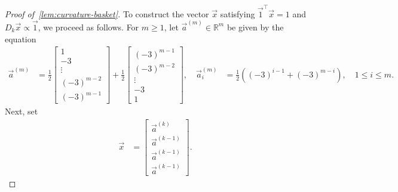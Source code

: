 \documentclass[11pt,a4paper]{article}
\newcommand{\distmatrix}{D}
\newcommand{\x}{\vec{x}}
\newcommand{\one}{\vec{1}}
\begin{document}
\begin{proof}[Proof of~\cref{lem:curvature-basket}]
        To construct the vector $\x $ satisfying $\one^\top\x  = 1$ and $\distmatrix_k \x\propto \one $, we proceed as follows. For $m\geq 1$, let $\vec{a}^{(m)}\in\mathbb{R}^{m}$ be given by the equation
            \begin{align}\label{eq:defn-am}
                \vec{a}^{(m)} &= \frac{1}{2} \begin{bmatrix}
                    1\\
                    {-3}\\
                    \vdots\\
                    ({-3})^{m-2}\\
                    ({-3})^{m-1}
                \end{bmatrix} + \frac{1}{2} \begin{bmatrix}
                    ({-3})^{m-1}\\
                    ({-3})^{m-2}\\
                    \vdots\\
                    {-3}\\
                    1
                \end{bmatrix},\quad \vec{a}^{(m)}_i &= \frac{1}{2}\left((-3)^{i-1} + (-3)^{m-i}\right),\quad 1\leq i \leq m.
            \end{align}
        Next, set
            \begin{align*}
                \x  &= \begin{bmatrix}
                    \vec{a}^{(k)}\\
                    \vec{a}^{(k-1)}\\
                    \vec{a}^{(k-1)}\\
                    \vec{a}^{(k-1)}
                \end{bmatrix}.
            \end{align*}


\end{proof}
\end{document}
